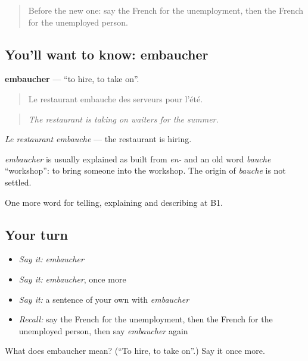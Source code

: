 \begin{quote}
Before the new one: say the French for the unemployment, then the French for the unemployed person.
\end{quote}

\subsection*{You'll want to know: embaucher}
\textbf{embaucher} — \textquotedblleft{}to hire, to take on\textquotedblright{}.

\begin{quote}
Le restaurant embauche des serveurs pour l'été.
\end{quote}

\begin{quote}
\emph{The restaurant is taking on waiters for the summer.}
\end{quote}

\emph{Le restaurant embauche} — the restaurant is hiring.

\begin{cousinweb}
\emph{embaucher} is usually explained as built from \emph{en-} and an old word \emph{bauche} \textquotedblleft{}workshop\textquotedblright{}: to bring someone into the workshop. The origin of \emph{bauche} is not settled.
\end{cousinweb}

\begin{grammarlens}[title={What you've built}]
One more word for telling, explaining and describing at B1.
\end{grammarlens}

\subsection*{Your turn}
\begin{itemize}
\raggedright
  \item \emph{Say it:} \emph{embaucher}
  \item \emph{Say it:} \emph{embaucher}, once more
  \item \emph{Say it:} a sentence of your own with \emph{embaucher}
  \item \emph{Recall:} say the French for the unemployment, then the French for the unemployed person, then say \emph{embaucher} again
\end{itemize}

\begin{tcolorbox}[breakable,colback=teal!4,colframe=teal!35!black,title={Before you move on}]
What does embaucher mean? (\textquotedblleft{}To hire, to take on\textquotedblright{}.) Say it once more.
\end{tcolorbox}
